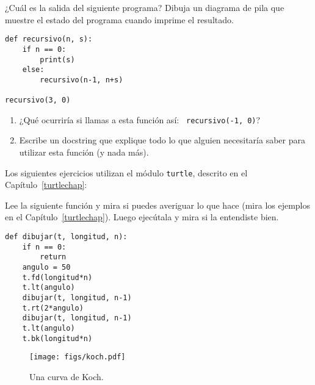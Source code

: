 \documentclass[10pt]{book}
\begin{document}
\begin{exercise}
¿Cuál es la salida del siguiente programa?
Dibuja un diagrama de pila que muestre el estado del programa
cuando imprime el resultado.

\begin{verbatim}
def recursivo(n, s):
    if n == 0:
        print(s)
    else:
        recursivo(n-1, n+s)

recursivo(3, 0)
\end{verbatim}

\begin{enumerate}

\item ¿Qué ocurriría si llamas a esta función así: {\tt
  recursivo(-1, 0)}?

\item Escribe un docstring que explique todo lo que alguien necesitaría
  saber para utilizar esta función (y nada más).

\end{enumerate}

\end{exercise}


Los siguientes ejercicios utilizan el módulo {\tt turtle}, descrito en el
Capítulo~\ref{turtlechap}:

\begin{exercise}

Lee la siguiente función y mira si puedes averiguar
lo que hace (mira los ejemplos en el Capítulo~\ref{turtlechap}).  Luego ejecútala
y mira si la entendiste bien.

\begin{verbatim}
def dibujar(t, longitud, n):
    if n == 0:
        return
    angulo = 50
    t.fd(longitud*n)
    t.lt(angulo)
    dibujar(t, longitud, n-1)
    t.rt(2*angulo)
    dibujar(t, longitud, n-1)
    t.lt(angulo)
    t.bk(longitud*n)
\end{verbatim}

\end{exercise}


\begin{figure}
\centerline
{\texttt{[image: figs/koch.pdf]}}
\caption{Una curva de Koch.}
\label{fig.koch}
\end{figure}
\end{document}
